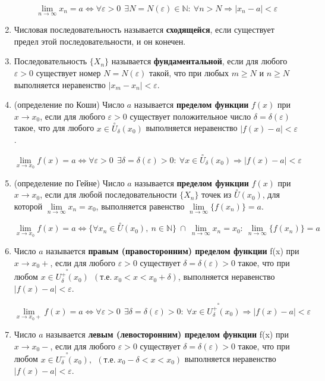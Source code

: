 \begin{enumerate}
$$\lim\limits_{n \to \infty}x_n = a \iff \forall {\varepsilon}>0 \ \ \exists N = N({\varepsilon}) \in \mathbb{N}: \ \forall n > N \Rightarrow | x_n - a|  < {\varepsilon}
    $$
\item Числовая последовательность называется \textbf{сходящейся}, если существует предел этой последовательности, и он конечен.
\item Последовательность $\{X_n\}$ называется \textbf{фундаментальной}, если для любого ${\varepsilon} > 0$ существует номер $N = N({\varepsilon})$ такой, что при любых $m \geqslant N$ и $n \geqslant N$ выполняется неравенство $\mid  x_m - x_n\mid   < {\varepsilon}$.
\item (определение по Коши) Число $a$ называется \textbf{пределом функции} $f(x)$ при $x \rightarrow x_0$, если для любого ${\varepsilon} > 0$ существует положительное число $\delta = \delta ({\varepsilon})$ такое, что для любого $x \in \overset{\circ}U_\delta(x_0)$ выполняется неравенство $\mid  f(x) - a\mid   < {\varepsilon}$.

$$\lim\limits_{x \to x_0} f(x) = a \iff \forall{\varepsilon} > 0 \ \ \exists \delta = \delta({\varepsilon}) > 0 : \ \forall x \in \overset{\circ}U_\delta(x_0) \Rightarrow | f(x) - a|  < {\varepsilon}
    $$
\item (определение по Гейне) Число $a$ называется \textbf{пределом функции} $f(x)$ при $x \rightarrow x_0$, если для любой последовательности $\{X_n\}$ точек из $\overset{\circ}U(x_0)$, для которой $\lim\limits_{n \to \infty}x_n = x_0$, выполняется равенство $\lim\limits_{n \to \infty}\{f(x_n)\} = a$.

$$\lim\limits_{x \to x_0}f(x) = a \iff \{\forall x_n \in \overset{\circ}U(x_0), \ n \in \mathbb{N}\} \ \cap \ \lim\limits_{n \to \infty}{x_n} = x_0 : \ 
    \lim\limits_{n \to \infty}\{f(x_n)\} = a
    $$
\item Число $a$ называется \textbf{правым (правосторонним) пределом функции} f(x) при $x \rightarrow x_0 +$, если для любого ${\varepsilon} > 0$ существует $\delta = \delta({\varepsilon}) > 0$ такое, что при любом $x \in {\overset{\circ\hspace{22pt}}{U^+_\delta(x_0)}} \ \ (\text{т.е.} \ x_0 < x < x_0 + \delta)$, выполняется неравенство $\mid  f(x) - a\mid   < {\varepsilon}$.

$$\lim\limits_{x \to x_0 +} f(x) = a \iff \forall{\varepsilon} > 0 \ \ \exists \delta = \delta({\varepsilon}) > 0 : \ \forall x \in {\overset{\circ\hspace{22pt}}{U^+_\delta(x_0)}}  \Rightarrow | f(x) - a|  < {\varepsilon}
    $$
\item Число $a$ называется \textbf{левым (левосторонним) пределом функции} f(x) при $x \rightarrow x_0 -$, если для любого ${\varepsilon} > 0$ существует $\delta = \delta({\varepsilon}) > 0$ такое, что при любом $x \in {\overset{\circ\hspace{22pt}}{U^-_\delta(x_0)}}, \ \ (\text{т.е.} \ x_0 - \delta < x < x_0)$ выполняется неравенство $\mid  f(x) - a\mid   < {\varepsilon}$.


\end{enumerate}
